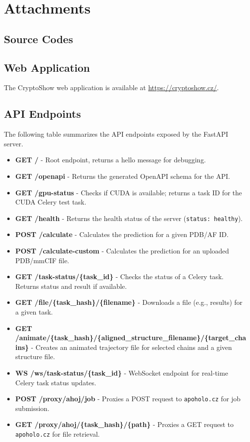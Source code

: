 \chapter{Attachments}

\section{Source Codes}
\label{sec:source-codes}


\section{Web Application}
\label{sec:web-application}

The CryptoShow web application is available at \url{https://cryptoshow.cz/}.

\section{API Endpoints}
\label{sec:api-endpoints}

The following table summarizes the API endpoints exposed by the FastAPI server.

\begin{itemize}
    \item \textbf{GET /} - Root endpoint, returns a hello message for debugging.
    \item \textbf{GET /openapi} - Returns the generated OpenAPI schema for the API.
    \item \textbf{GET /gpu-status} - Checks if CUDA is available; returns a task ID for the CUDA Celery test task.
    \item \textbf{GET /health} - Returns the health status of the server (\lstinline|status: healthy|).
    \item \textbf{POST /calculate} - Calculates the prediction for a given PDB/AF ID.
    \item \textbf{POST /calculate-custom} - Calculates the prediction for an uploaded PDB/mmCIF file.
    \item \textbf{GET /task-status/\{task\_id\}} - Checks the status of a Celery task. Returns status and result if available.
    \item \textbf{GET /file/\{task\_hash\}/\{filename\}} - Downloads a file (e.g., results) for a given task.
    \item \textbf{GET /animate/\{task\_hash\}/\{aligned\_structure\_filename\}/\{target\_chains\}} - Creates an animated trajectory file for selected chains and a given structure file.
    \item \textbf{WS /ws/task-status/\{task\_id\}} - WebSocket endpoint for real-time Celery task status updates.
    \item \textbf{POST /proxy/ahoj/job} - Proxies a POST request to \lstinline|apoholo.cz| for job submission.
    \item \textbf{GET /proxy/ahoj/\{task\_hash\}/\{path\}} - Proxies a GET request to \lstinline|apoholo.cz| for file retrieval.
\end{itemize}
